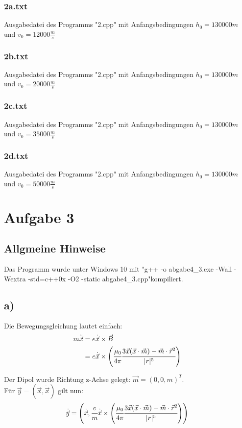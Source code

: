 \documentclass{scrreprt}
\begin{document}
\subsection*{2a.txt}
Ausgabedatei des Programms "2.cpp" mit Anfangsbedingungen $h_0 = 130000 m$ und $v_0 = 12000 \frac{m}{s}$
\subsection*{2b.txt}
Ausgabedatei des Programms "2.cpp" mit Anfangsbedingungen $h_0 = 130000 m$ und $v_0 = 20000 \frac{m}{s}$
\subsection*{2c.txt}
Ausgabedatei des Programms "2.cpp" mit Anfangsbedingungen $h_0 = 130000 m$ und $v_0 = 35000 \frac{m}{s}$
\subsection*{2d.txt}
Ausgabedatei des Programms "2.cpp" mit Anfangsbedingungen $h_0 = 130000 m$ und $v_0 = 50000 \frac{m}{s}$

\chapter*{Aufgabe 3}
\section*{Allgmeine Hinweise}
Das Programm wurde unter Windows 10 mit "g++ -o abgabe4\_3.exe -Wall -Wextra -std=c++0x -O2 -static abgabe4\_3.cpp"\;kompiliert.

\section*{a)}
Die Bewegungsgleichung lautet einfach:
\begin{align}
m\ddot{\vec{x}} &= e\dot{\vec{x}} \times \vec{B}\\
				&= e\dot{\vec{x}} \times \left(\cfrac{\mu_0}{4\pi}\cfrac{3\vec{x}(\vec{x} \cdot \vec{m}) - \vec{m}\cdot\vec{r}^2}{|r|^5}\right)  
\end{align}

Der Dipol wurde Richtung z-Achse gelegt: $\vec{m} = (0,0,m)^T$.\\

Für $\vec{y} = (\vec{x},\dot{\vec{x}})$ gilt nun:\\
\begin{align}
\dot{\vec{y}} = \left(\dot{\vec{x}},  \cfrac{e}{m}\dot{\vec{x}} \times \left(\cfrac{\mu_0}{4\pi}\cfrac{3\vec{x}(\vec{x} \cdot \vec{m}) - \vec{m}\cdot\vec{r}^2}{|r|^5}\right)\right)  
\end{align}
\end{document}
